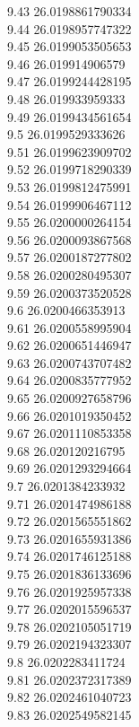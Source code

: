{9.43	26.0198861790334\\
9.44	26.0198957747322\\
9.45	26.0199053505653\\
9.46	26.019914906579\\
9.47	26.0199244428195\\
9.48	26.019933959333\\
9.49	26.0199434561654\\
9.5	26.0199529333626\\
9.51	26.0199623909702\\
9.52	26.0199718290339\\
9.53	26.0199812475991\\
9.54	26.0199906467112\\
9.55	26.0200000264154\\
9.56	26.0200093867568\\
9.57	26.0200187277802\\
9.58	26.0200280495307\\
9.59	26.0200373520528\\
9.6	26.0200466353913\\
9.61	26.0200558995904\\
9.62	26.0200651446947\\
9.63	26.0200743707482\\
9.64	26.0200835777952\\
9.65	26.0200927658796\\
9.66	26.0201019350452\\
9.67	26.0201110853358\\
9.68	26.020120216795\\
9.69	26.0201293294664\\
9.7	26.0201384233932\\
9.71	26.0201474986188\\
9.72	26.0201565551862\\
9.73	26.0201655931386\\
9.74	26.0201746125188\\
9.75	26.0201836133696\\
9.76	26.0201925957338\\
9.77	26.0202015596537\\
9.78	26.0202105051719\\
9.79	26.0202194323307\\
9.8	26.0202283411724\\
9.81	26.0202372317389\\
9.82	26.0202461040723\\
9.83	26.0202549582145\\
}
